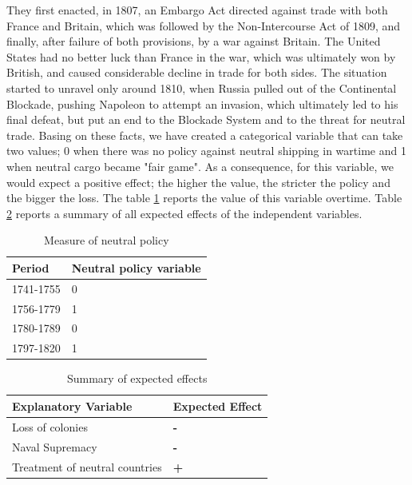 \documentclass[12pt,a4paper,notitlepage,english]{article}
\begin{document}
They first enacted, in 1807, an Embargo Act directed against trade with both France and Britain, which was followed by the Non-Intercourse Act of 1809, and finally, after failure of both provisions, by a war against Britain.
The United States had no better luck than France in the war, which was ultimately won by British, and caused considerable decline in trade for both sides.
The situation started to unravel only around 1810, when Russia pulled out of the Continental Blockade, pushing Napoleon to attempt an invasion, which ultimately led to his final defeat, but put an end to the Blockade System and to the threat for neutral trade.
Basing on these facts, we have created a categorical variable that can take two values; 0 when there was no policy against neutral shipping in wartime and 1 when neutral cargo became "fair game". 
As a consequence, for this variable, we would expect a positive effect; the higher the value, the stricter the policy and the bigger the loss.
The table \ref{neutral_policy} reports the value of this variable overtime.
Table \ref{summary} reports a summary of all expected effects of the independent variables.


\begin{table}[H]
\centering
\caption{Measure of neutral policy}
\label{neutral_policy}
\begin{tabular}{ll}
\hline \hline
Period & Neutral policy variable  \\ \hline
1741-1755 & 0                  \\
1756-1779 & 1       \\
1780-1789 & 0                 \\
1797-1820 & 1                 \\
\hline 
\end{tabular}
\end{table}

\begin{table}[H]
\centering
\caption{Summary of expected effects}
\label{summary}
\begin{tabular}{ll}
\hline \hline
Explanatory Variable & Expected Effect  \\ \hline
Loss of colonies & \textbf{-}                  \\
Naval Supremacy & \textbf{-}                 \\
Treatment of neutral countries &       \textbf{+}      \\ \hline 
\end{tabular}
\end{table}
\end{document}
